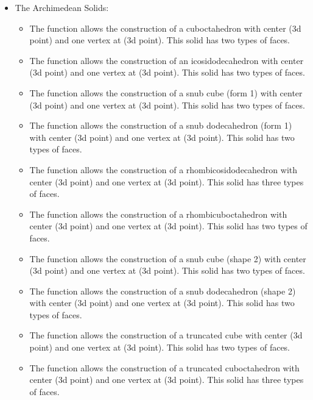 \begin{itemize}
    \item The Archimedean Solids:
\begin{itemize}
    \item The function  allows the construction of a cuboctahedron with center  (3d point) and one vertex at  (3d point). This solid has two types of faces.
    \item The function  allows the construction of an icosidodecahedron with center  (3d point) and one vertex at  (3d point). This solid has two types of faces.
    \item The function  allows the construction of a snub cube (form 1) with center  (3d point) and one vertex at  (3d point). This solid has two types of faces.
    \item The function  allows the construction of a snub dodecahedron (form 1) with center  (3d point) and one vertex at  (3d point). This solid has two types of faces.
    \item The function  allows the construction of a rhombicosidodecahedron with center  (3d point) and one vertex at  (3d point). This solid has three types of faces.
    \item The function  allows the construction of a rhombicuboctahedron with center  (3d point) and one vertex at  (3d point). This solid has two types of faces.
    \item The function  allows the construction of a snub cube (shape 2) with center  (3d point) and one vertex at  (3d point). This solid has two types of faces.
    \item The function  allows the construction of a snub dodecahedron (shape 2) with center  (3d point) and one vertex at  (3d point). This solid has two types of faces.
    \item The function  allows the construction of a truncated cube with center  (3d point) and one vertex at  (3d point). This solid has two types of faces.
    \item The function  allows the construction of a truncated cuboctahedron with center  (3d point) and one vertex at  (3d point). This solid has three types of faces.

\end{itemize}
\end{itemize}
